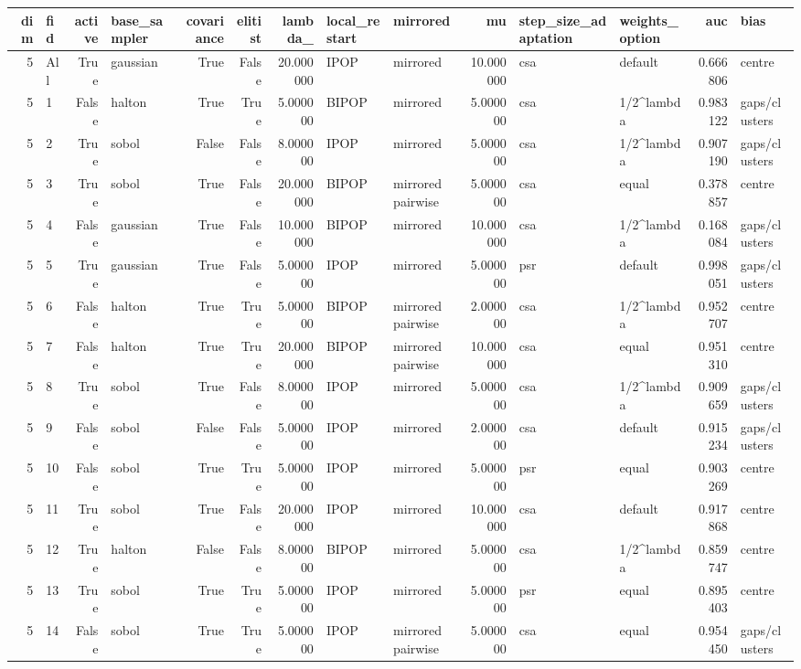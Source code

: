 \begin{tabular}{rlrlrrrllrllrl}
\toprule
dim & fid & active & base_sampler & covariance & elitist & lambda_ & local_restart & mirrored & mu & step_size_adaptation & weights_option & auc & bias \\
\midrule
5 & All & True & gaussian & True & False & 20.000000 & IPOP & mirrored & 10.000000 & csa & default & 0.666806 & centre \\
5 & 1 & False & halton & True & True & 5.000000 & BIPOP & mirrored & 5.000000 & csa & 1/2^lambda & 0.983122 & gaps/clusters \\
5 & 2 & True & sobol & False & False & 8.000000 & IPOP & mirrored & 5.000000 & csa & 1/2^lambda & 0.907190 & gaps/clusters \\
5 & 3 & True & sobol & True & False & 20.000000 & BIPOP & mirrored pairwise & 5.000000 & csa & equal & 0.378857 & centre \\
5 & 4 & False & gaussian & True & False & 10.000000 & BIPOP & mirrored & 10.000000 & csa & 1/2^lambda & 0.168084 & gaps/clusters \\
5 & 5 & True & gaussian & True & False & 5.000000 & IPOP & mirrored & 5.000000 & psr & default & 0.998051 & gaps/clusters \\
5 & 6 & False & halton & True & True & 5.000000 & BIPOP & mirrored pairwise & 2.000000 & csa & 1/2^lambda & 0.952707 & centre \\
5 & 7 & False & halton & True & True & 20.000000 & BIPOP & mirrored pairwise & 10.000000 & csa & equal & 0.951310 & centre \\
5 & 8 & True & sobol & True & False & 8.000000 & IPOP & mirrored & 5.000000 & csa & 1/2^lambda & 0.909659 & gaps/clusters \\
5 & 9 & False & sobol & False & False & 5.000000 & IPOP & mirrored & 2.000000 & csa & default & 0.915234 & gaps/clusters \\
5 & 10 & False & sobol & True & True & 5.000000 & IPOP & mirrored & 5.000000 & psr & equal & 0.903269 & centre \\
5 & 11 & True & sobol & True & False & 20.000000 & IPOP & mirrored & 10.000000 & csa & default & 0.917868 & centre \\
5 & 12 & True & halton & False & False & 8.000000 & BIPOP & mirrored & 5.000000 & csa & 1/2^lambda & 0.859747 & centre \\
5 & 13 & True & sobol & True & True & 5.000000 & IPOP & mirrored & 5.000000 & psr & equal & 0.895403 & centre \\
5 & 14 & False & sobol & True & True & 5.000000 & IPOP & mirrored pairwise & 5.000000 & csa & equal & 0.954450 & gaps/clusters \\

\end{tabular}
